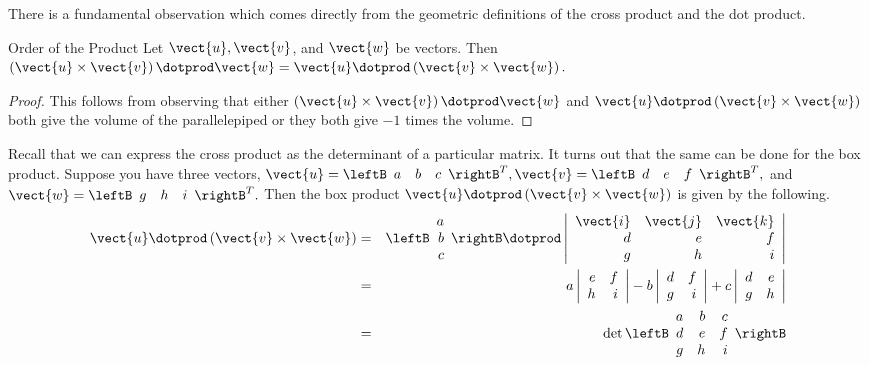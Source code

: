 There is a fundamental observation which comes directly from the geometric
definitions of the cross product and the dot product.

\begin{proposition}{Order of the Product}\label{prop:orderofproduct}
Let $\vect{u},\vect{v}$, and $\vect{w}$ be vectors. Then $\left(
\vect{u}\times \vect{v}\right) \dotprod \vect{w}=\vect{u}\dotprod \left( \vect{v}\times \vect{w}
\right) .$
\end{proposition}

\begin{proof}This follows from observing that either 
$\left( \vect{u}\times \vect{v}\right) \dotprod \vect{w}$ and $\vect{u}\dotprod 
\left( \vect{v}\times \vect{w}\right) $ both give the volume of the parallelepiped or they both
give $-1$ times the volume.
\end{proof}

Recall that we can express the cross product as the determinant of a particular matrix. It turns out
that the same can be done for the box product. 
Suppose you have three vectors, $\vect{u}=\leftB
\begin{array}{rrr}
a & b & c
\end{array}
\rightB^T ,\vect{v}=\leftB
\begin{array}{rrr}
 d & e & f
\end{array}
\rightB^T ,$ and $\vect{w}=\leftB
\begin{array}{rrr}
g & h & i
\end{array}
\rightB^T .$ Then the box product $\vect{u}\dotprod \left(\vect{v}\times \vect{w}\right)$ is given by the following.
\begin{eqnarray*}
\vect{u}\dotprod \left(\vect{v}\times \vect{w}\right) &=&
\leftB 
\begin{array}{r}
a \\
b \\
c
\end{array}
\rightB \dotprod \left|
\begin{array}{rrr}
\vect{i} & \vect{j} & \vect{k} \\
d & e & f \\
g & h & i
\end{array}
\right| \\
&=&a\left|
\begin{array}{rr}
e & f \\
h & i
\end{array}
\right| -b\left|
\begin{array}{rr}
d & f \\
g & i
\end{array}
\right| +c\left|
\begin{array}{rr}
d & e \\
g & h
\end{array}
\right| \\
&= &\det \leftB
\begin{array}{rrr}
a & b & c \\
d & e & f \\
g & h & i
\end{array}
\rightB 
\end{eqnarray*}

